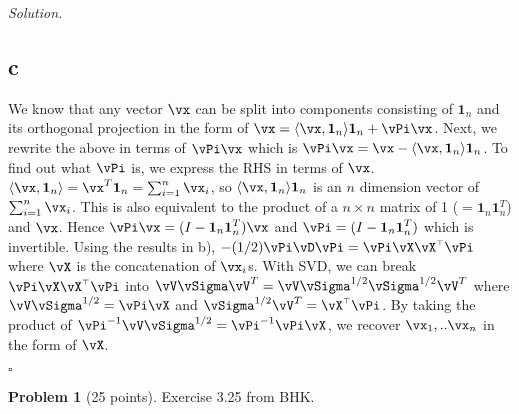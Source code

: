 \documentclass[11pt]{article}
\renewcommand\v[1]{{\ensuremath{\boldsymbol{#1}}}}
\renewcommand\t{{\ensuremath{\scriptscriptstyle{\top}}}}
\theoremstyle{definition}
\newtheorem{problem}{Problem}
\newenvironment{solution}{\noindent\emph{Solution.}}{\hfill$\square$}
\begin{document}
\begin{solution}
\subsection*{c}
We know that any vector $\vx$ can be split into components consisting of $\v1_n$ and its orthogonal projection in the form of $\vx = \langle \vx, \v1_n \rangle \v1_n + \vPi \vx$. Next, we rewrite the above in terms of $\vPi \vx$ which is $\vPi \vx = \vx - \langle \vx, \v1_n \rangle \v1_n$. To find out what $\vPi$ is, we express the RHS in terms of $\vx$. $\langle \vx, \v1_n \rangle = \vx^T \v1_n = \sum_{i=1}^n \vx_i$, so $\langle \vx, \v1_n \rangle \v1_n$ is an $n$ dimension vector of $\sum_{i=1}^n \vx_i$. This is also equivalent to the product of a $n \times n$ matrix of 1 ($= \v1_n \v1_n^T$)  and $\vx$. Hence $\vPi \vx = (I - \v1_n \v1_n^T)\vx$ and $\vPi = (I - \v1_n \v1_n^T)$ which is invertible. Using the results in b), $-(1/2)\vPi\vD\vPi =  \vPi\vX\vX^\t\vPi$ where $\vX$ is the concatenation of $\vx_i$s. With SVD, we can break $\vPi\vX\vX^\t\vPi$ into $\vV\vSigma\vV^T =  \vV\vSigma^{1/2}\vSigma^{1/2}\vV^T$ where $\vV\vSigma^{1/2} = \vPi\vX$ and $\vSigma^{1/2}\vV^T = \vX^\t\vPi$. By taking the product of $\vPi^{-1} \vV\vSigma^{1/2} = \vPi^{-1} \vPi\vX$, we recover $\vx_1, .. \vx_n$ in the form of $\vX$.

\end{solution}

\newpage


\begin{problem}[25 points]
  Exercise 3.25 from BHK.
\end{problem}
\end{document}
